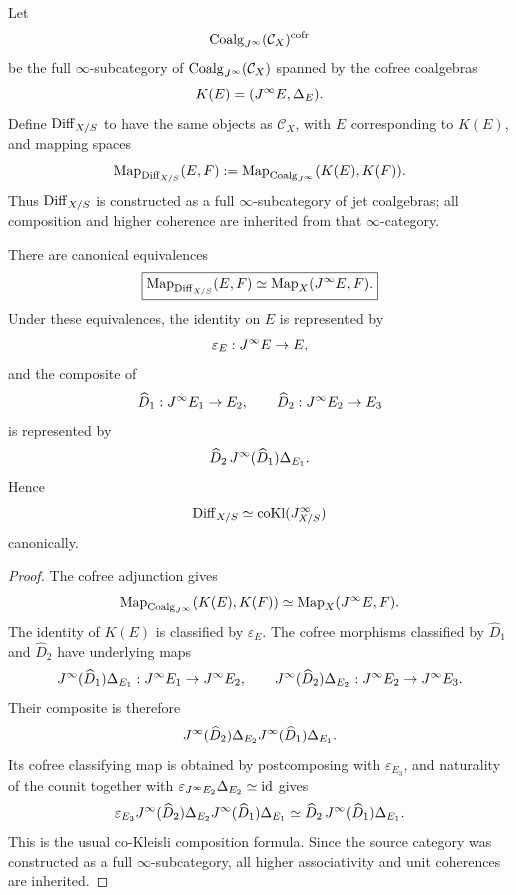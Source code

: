 \begin{construction}
\label{def:diff-cokleisli}
Let
\[
    \operatorname{Coalg}_{J^{\infty}}(\mathcal C_X)^{\mathrm{cofr}}
\]
be the full $\infty$-subcategory of $\operatorname{Coalg}_{J^{\infty}}(\mathcal C_X)$ spanned by the cofree coalgebras
\[
    K(E)=(J^{\infty} E,\Delta_E).
\]
Define $\operatorname{Diff}_{X/S}$ to have the same objects as $\mathcal C_X$, with $E$ corresponding to $K(E)$, and mapping spaces
\[
    \operatorname{Map}_{\operatorname{Diff}_{X/S}}(E,F)
    :=
    \operatorname{Map}_{\operatorname{Coalg}_{J^{\infty}}}(K(E),K(F)).
\]
Thus $\operatorname{Diff}_{X/S}$ is constructed as a full $\infty$-subcategory of jet coalgebras; all composition and higher coherence are inherited from that $\infty$-category.
\end{construction}

\begin{proposition}
\label{prop:diff-cokleisli-identification}
There are canonical equivalences
\[
\boxed{
    \operatorname{Map}_{\operatorname{Diff}_{X/S}}(E,F)
    \simeq
    \operatorname{Map}_X(J^{\infty} E,F).
}
\]
Under these equivalences, the identity on $E$ is represented by
\[
    \varepsilon_E:J^{\infty} E\to E,
\]
and the composite of
\[
    \widehat D_1:J^{\infty} E_1\to E_2,
    \qquad
    \widehat D_2:J^{\infty} E_2\to E_3
\]
is represented by
\[
    \widehat D_2\,J^{\infty}(\widehat D_1)\Delta_{E_1}.
\]
Hence
\[
    \operatorname{Diff}_{X/S}\simeq\operatorname{coKl}(J^{\infty}_{X/S})
\]
canonically.
\end{proposition}

\begin{proof}
The cofree adjunction gives
\[
    \operatorname{Map}_{\operatorname{Coalg}_{J^{\infty}}}(K(E),K(F))
    \simeq
    \operatorname{Map}_X(J^{\infty} E,F).
\]
The identity of $K(E)$ is classified by $\varepsilon_E$.  The cofree morphisms classified by $\widehat D_1$ and $\widehat D_2$ have underlying maps
\[
    J^{\infty}(\widehat D_1)\Delta_{E_1}:J^{\infty} E_1\to J^{\infty} E_2,
    \qquad
    J^{\infty}(\widehat D_2)\Delta_{E_2}:J^{\infty} E_2\to J^{\infty} E_3.
\]
Their composite is therefore
\[
    J^{\infty}(\widehat D_2)\Delta_{E_2}
    J^{\infty}(\widehat D_1)\Delta_{E_1}.
\]
Its cofree classifying map is obtained by postcomposing with $\varepsilon_{E_3}$, and naturality of the counit together with
$\varepsilon_{J^{\infty} E_2}\Delta_{E_2}\simeq\operatorname{id}$ gives
\[
    \varepsilon_{E_3}
    J^{\infty}(\widehat D_2)\Delta_{E_2}
    J^{\infty}(\widehat D_1)\Delta_{E_1}
    \simeq
    \widehat D_2\,J^{\infty}(\widehat D_1)\Delta_{E_1}.
\]
This is the usual co-Kleisli composition formula.  Since the source category was constructed as a full $\infty$-subcategory, all higher associativity and unit coherences are inherited.
\end{proof}

